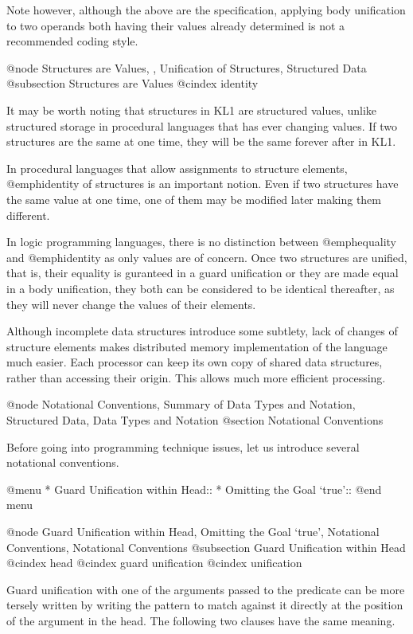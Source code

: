 {Note however, although the above are the specification, applying body
unification to two operands both having their values already determined
is not a recommended coding style.

@node Structures are Values,  , Unification of Structures, Structured Data
@subsection Structures are Values
@cindex identity

It may be worth noting that structures in KL1 are structured values,
unlike structured storage in procedural languages that has ever changing
values.  If two structures are the same at one time, they will be the
same forever after in KL1.

In procedural languages that allow assignments to structure elements,
@emph{identity} of structures is an important notion.  Even if two
structures have the same value at one time, one of them may be modified
later making them different.

In logic programming languages, there is no distinction between
@emph{equality} and @emph{identity} as only values are of concern.  Once
two structures are unified, that is, their equality is guranteed in a
guard unification or they are made equal in a body unification, they
both can be considered to be identical thereafter, as they will never
change the values of their elements.

Although incomplete data structures introduce some subtlety, lack of
changes of structure elements makes distributed memory implementation of
the language much easier.  Each processor can keep its own copy of
shared data structures, rather than accessing their origin.  This allows
much more efficient processing.

@node Notational Conventions, Summary of Data Types and Notation, Structured Data, Data Types and Notation
@section Notational Conventions

Before going into programming technique issues, let us introduce
several notational conventions.

@menu
* Guard Unification within Head::  
* Omitting the Goal `true'::    
@end menu

@node Guard Unification within Head, Omitting the Goal `true', Notational Conventions, Notational Conventions
@subsection Guard Unification within Head
@cindex head
@cindex guard unification
@cindex unification

Guard unification with one of the arguments passed to the predicate can
be more tersely written by writing the pattern to match against it
directly at the position of the argument in the head.  The following two
clauses have the same meaning.

}
